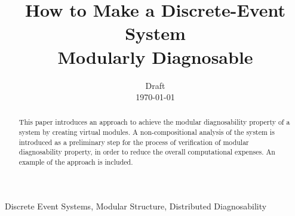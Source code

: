 \documentclass[a4paper, 10pt, conference]{ieeeconf} \IEEEoverridecommandlockouts
\begin{document}
\title{How to Make a Discrete-Event System \\ Modularly Diagnosable}
\author{Draft \\ \today}
\maketitle


\begin{abstract}
This paper introduces an approach to achieve the modular diagnosability property
of a system by creating virtual modules. A non-compositional analysis of the
system is introduced as a preliminary step for the process of verification of
modular diagnosability property, in order to reduce the overall computational
expenses. An example of the approach is included.
\end{abstract}

\begin{keywords}
Discrete Event Systems, Modular Structure, Distributed Diagnosability
\end{keywords}

\newtheorem{assumption}{Assumption}
\newtheorem{definition}{Definition}
\newtheorem{conjecture}{Conjecture}
\newtheorem{lemma}{Lemma}
\newtheorem{corollary}{Corollary}
\newtheorem{example}{Example}
\newtheorem{theorem}{Theorem}

\end{document}
